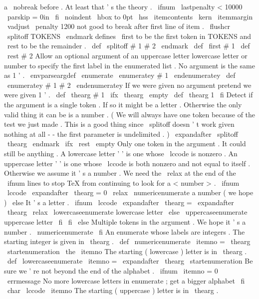 {{{{{a
\
nobreak
before
.
At
least
%
that
'
s
the
theory
.
\
ifnum
\
lastpenalty
<
10000
\
parskip
=
0in
\
fi
\
noindent
\
hbox
to
0pt
{
\
hss
\
itemcontents
\
kern
\
itemmargin
}
%
%
\
vadjust
{
\
penalty
1200
}
}
%
not
good
to
break
after
first
line
of
item
.
\
flushcr
}
%
\
splitoff
TOKENS
\
endmark
defines
\
first
to
be
the
first
token
in
%
TOKENS
and
\
rest
to
be
the
remainder
.
%
\
def
\
splitoff
#
1
#
2
\
endmark
{
\
def
\
first
{
#
1
}
\
def
\
rest
{
#
2
}
}
%
%
Allow
an
optional
argument
of
an
uppercase
letter
lowercase
letter
%
or
number
to
specify
the
first
label
in
the
enumerated
list
.
No
%
argument
is
the
same
as
1
'
.
%
\
envparseargdef
\
enumerate
{
\
enumeratey
#
1
\
endenumeratey
}
\
def
\
enumeratey
#
1
#
2
\
endenumeratey
{
%
%
If
we
were
given
no
argument
pretend
we
were
given
1
'
.
\
def
\
thearg
{
#
1
}
%
\
ifx
\
thearg
\
empty
\
def
\
thearg
{
1
}
\
fi
%
%
Detect
if
the
argument
is
a
single
token
.
If
so
it
might
be
a
%
letter
.
Otherwise
the
only
valid
thing
it
can
be
is
a
number
.
%
(
We
will
always
have
one
token
because
of
the
test
we
just
made
.
%
This
is
a
good
thing
since
\
splitoff
doesn
'
t
work
given
nothing
at
%
all
-
-
the
first
parameter
is
undelimited
.
)
\
expandafter
\
splitoff
\
thearg
\
endmark
\
ifx
\
rest
\
empty
%
Only
one
token
in
the
argument
.
It
could
still
be
anything
.
%
A
lowercase
letter
'
'
is
one
whose
\
lccode
is
nonzero
.
%
An
uppercase
letter
'
'
is
one
whose
\
lccode
is
both
nonzero
and
%
not
equal
to
itself
.
%
Otherwise
we
assume
it
'
s
a
number
.
%
%
We
need
the
\
relax
at
the
end
of
the
\
ifnum
lines
to
stop
TeX
from
%
continuing
to
look
for
a
<
number
>
.
%
\
ifnum
\
lccode
\
expandafter
\
thearg
=
0
\
relax
\
numericenumerate
%
a
number
(
we
hope
)
\
else
%
It
'
s
a
letter
.
\
ifnum
\
lccode
\
expandafter
\
thearg
=
\
expandafter
\
thearg
\
relax
\
lowercaseenumerate
%
lowercase
letter
\
else
\
uppercaseenumerate
%
uppercase
letter
\
fi
\
fi
\
else
%
Multiple
tokens
in
the
argument
.
We
hope
it
'
s
a
number
.
\
numericenumerate
\
fi
}
%
An
enumerate
whose
labels
are
integers
.
The
starting
integer
is
%
given
in
\
thearg
.
%
\
def
\
numericenumerate
{
%
\
itemno
=
\
thearg
\
startenumeration
{
\
the
\
itemno
}
%
}
%
The
starting
(
lowercase
)
letter
is
in
\
thearg
.
\
def
\
lowercaseenumerate
{
%
\
itemno
=
\
expandafter
\
thearg
\
startenumeration
{
%
%
Be
sure
we
'
re
not
beyond
the
end
of
the
alphabet
.
\
ifnum
\
itemno
=
0
\
errmessage
{
No
more
lowercase
letters
in
enumerate
;
get
a
bigger
alphabet
}
%
\
fi
\
char
\
lccode
\
itemno
}
%
}
%
The
starting
(
uppercase
)
letter
is
in
\
thearg
.
\
}}}
